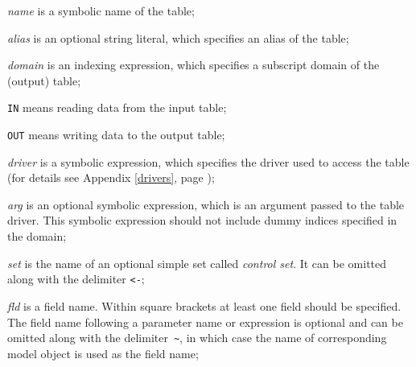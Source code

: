\documentclass[11pt]{report}
\begin{document}
\noindent
{}

\medskip

\noindent
{\it name} is a symbolic name of the table;

\noindent
{\it alias} is an optional string literal, which specifies an alias of
the table;

\noindent
{\it domain} is an indexing expression, which specifies a subscript
domain of the (output) table;

\noindent
{\tt IN} means reading data from the input table;

\noindent
{\tt OUT} means writing data to the output table;

\noindent
{\it driver} is a symbolic expression, which specifies the driver used
to access the table (for details see Appendix \ref{drivers}, page
\pageref{drivers});

\noindent
{\it arg} is an optional symbolic expression, which is an argument
pass\-ed to the table driver. This symbolic expression should not
include dummy indices specified in the domain;

\noindent
{\it set} is the name of an optional simple set called {\it control
set}. It can be omitted along with the delimiter {\tt<-};

\noindent
{\it fld} is a field name. Within square brackets at least one field
should be specified. The field name following a parameter name or
expression is optional and can be omitted along with the
delimiter~{\tt\textasciitilde}, in which case the name of corresponding
model object is used as the field name;
\end{document}
